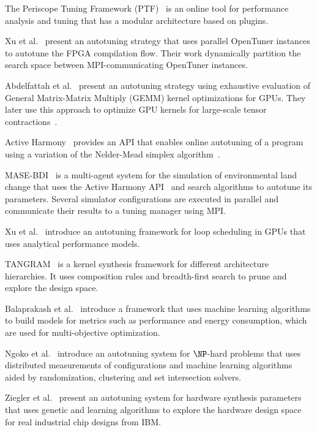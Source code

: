 The Periscope Tuning Framework
(PTF)~\cite{gerndt2005periscope,gerndt2010automatic,gerndt2017multi} is an
online tool for performance analysis and tuning that has a modular architecture
based on plugins.

Xu et al.~\cite{xu2017parallel} present an autotuning strategy that uses
parallel OpenTuner instances to autotune the FPGA compilation flow.  Their work
dynamically partition the search space between MPI-communicating OpenTuner
instances.

Abdelfattah et al.~\cite{abdelfattah2016performance} present an autotuning
strategy using exhaustive evaluation of General Matrix-Matrix Multiply (GEMM)
kernel optimizations for GPUs. They later use this approach to optimize GPU
kernels for large-scale tensor contractions~\cite{abdelfattah2016high}.

Active Harmony~\cite{tapus2002active} provides an API that enables
online autotuning of a program using a variation of the Nelder-Mead
simplex algorithm~\cite{nelder1965simplex}.

MASE-BDI~\cite{coelho2016mase} is a multi-agent system for the simulation of
environmental land change that uses the Active Harmony
API~\cite{tapus2002active} and search algorithms to autotune its parameters.
Several simulator configurations are executed in parallel and communicate their
results to a tuning manager using MPI.

Xu et al.~\cite{xu2016analytical} introduce an autotuning framework for
loop scheduling in GPUs that uses analytical performance models.

TANGRAM~\cite{chang2015tangram,chang2016efficient} is a kernel
synthesis framework for different architecture hierarchies.
It uses composition rules and breadth-first search to prune
and explore the design space.

Balaprakash et al.~\cite{balaprakash2016automomml} introduce a framework
that uses machine learning algorithms to build models for metrics such as
performance and energy consumption, which are used for multi-objective
optimization.

Ngoko et al.~\cite{ngoko2016automatic} introduce an autotuning system for
$\NP$-hard problems that uses distributed measurements of configurations and
machine learning algorithms aided by randomization, clustering and set
intersection solvers.

Ziegler et al.~\cite{ziegler2016synthesis,ziegler2016scalable} present an
autotuning system for hardware synthesis parameters that uses genetic and
learning algorithms to explore the hardware design space for real industrial
chip designs from IBM.

